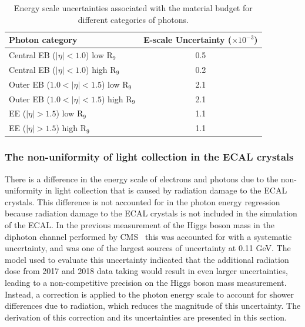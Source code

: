 \begin{table}[h]
    \centering
    \begin{tabular}{|l|c|}
        \hline
        \textbf{Photon category} & \textbf{E-scale Uncertainty ($\times 10^{-3}$)}  \\ \hline
        Central EB ($|\eta| < 1.0$) low R$_9$ & 0.5 \\
        Central EB ($|\eta| < 1.0$) high R$_9$ & 0.2 \\
        Outer EB ($1.0 < |\eta| < 1.5$) low R$_9$ & 2.1 \\
        Outer EB ($1.0 < |\eta| < 1.5$) high R$_9$ & 2.1 \\
        EE ($|\eta| > 1.5$) low R$_9$ & 1.1 \\
        EE ($|\eta| > 1.5$) high R$_9$ & 1.1 \\ \hline
    \end{tabular}
    \caption[Material uncertainties]{Energy scale uncertainties associated with the material budget for different categories of photons.}
    \label{tab:mat_unc}
\end{table}

\subsubsection{The non-uniformity of light collection in the ECAL crystals}

There is a difference in the energy scale of electrons and photons due to the non-uniformity in light collection that is caused by radiation damage to the ECAL crystals. This difference is not accounted for in the photon energy regression because radiation damage to the ECAL crystals is not included in the simulation of the ECAL. In the previous measurement of the Higgs boson mass in the diphoton channel performed by CMS~\cite{cms:2020:higgs_mass} this was accounted for with a systematic uncertainty, and was one of the largest sources of uncertainty at 0.11 GeV. The model used to evaluate this uncertainty indicated that the additional radiation dose from 2017 and 2018 data taking would result in even larger uncertainties, leading to a non-competitive precision on the Higgs boson mass measurement. Instead, a correction is applied to the photon energy scale to account for shower differences due to radiation, which reduces the magnitude of this uncertainty. The derivation of this correction and its uncertainties are presented in this section.

